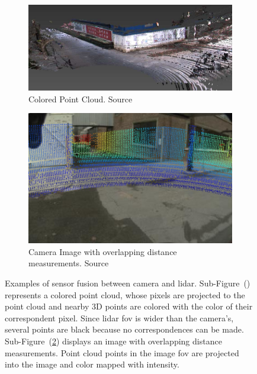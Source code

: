 \begin{figure}[!ht]
	\centering
	\begin{subfigure}[t]{0.55\textwidth}
		\includegraphics[width=\textwidth]{img/sensor_fusion/colored_point_cloud.png}
		\caption{Colored Point Cloud. Source~\cite{Gong2013}}
		\label{fig:colored_point_cloud_example}
	\end{subfigure}
	\quad
	\begin{subfigure}[t]{0.40\textwidth}
		\includegraphics[width=\textwidth]{img/sensor_fusion/image_with_distance_point_cutted.png}
		\caption{Camera Image with overlapping distance measurements. Source~\cite{Bileschi2009}}
		\label{fig:image_with_lidar_distance}
	\end{subfigure}
	\caption[Examples of state of the art sensor fusion results between camera and \acs{lidar} data.]{Examples of sensor fusion between camera and \ac{lidar}. Sub-Figure~() represents a colored point cloud, whose pixels are projected to the point cloud and nearby 3D points are colored with the color of their correspondent pixel. Since \ac{lidar} \ac{fov} is wider than the camera's, several points are black because no correspondences can be made. Sub-Figure~(\ref{fig:image_with_lidar_distance}) displays an image with overlapping distance measurements. Point cloud points in the image \ac{fov} are projected into the image and color mapped with intensity.}
	\label{fig:point_cloud_camera_fusion_example}
\end{figure}

